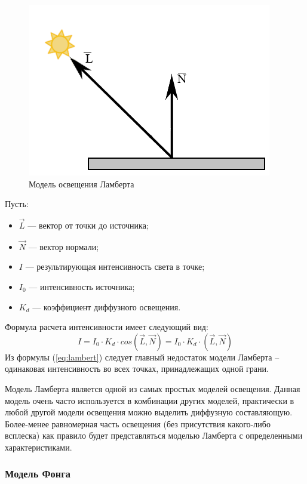 \begin{figure}[h]
	\centering
	\includegraphics[height=0.3\textheight]{img/lambert.png}
	\caption{Модель освещения Ламберта}
	\label{img:lambert}
\end{figure}

Пусть:
\begin{itemize}
	\item $\overrightarrow L$ --- вектор от точки до источника;
	\item $\overrightarrow N$ --- вектор нормали;
	\item $I$ --- результирующая интенсивность света в точке;
	\item $I_0$ --- интенсивность источника;
	\item $K_d$ --- коэффициент диффузного освещения.
\end{itemize}

Формула расчета интенсивности имеет следующий вид:
\begin{equation}
	\label{eq:lambert}
	I = I_0 \cdot K_d \cdot cos(\overrightarrow L, \overrightarrow N) = I_0 \cdot K_d \cdot (\overrightarrow L, \overrightarrow N) 
\end{equation}
Из формулы (\ref{eq:lambert}) следует главный недостаток модели Ламберта – одинаковая интенсивность во всех точках, принадлежащих одной грани.

Модель Ламберта является одной из самых простых моделей освещения. Данная модель очень часто используется в комбинации других моделей, практически в любой другой модели освещения можно выделить диффузную составляющую. Более-менее равномерная часть освещения (без присутствия какого-либо всплеска) как правило будет представляться моделью Ламберта с определенными характеристиками.

\subsubsection{Модель Фонга}

